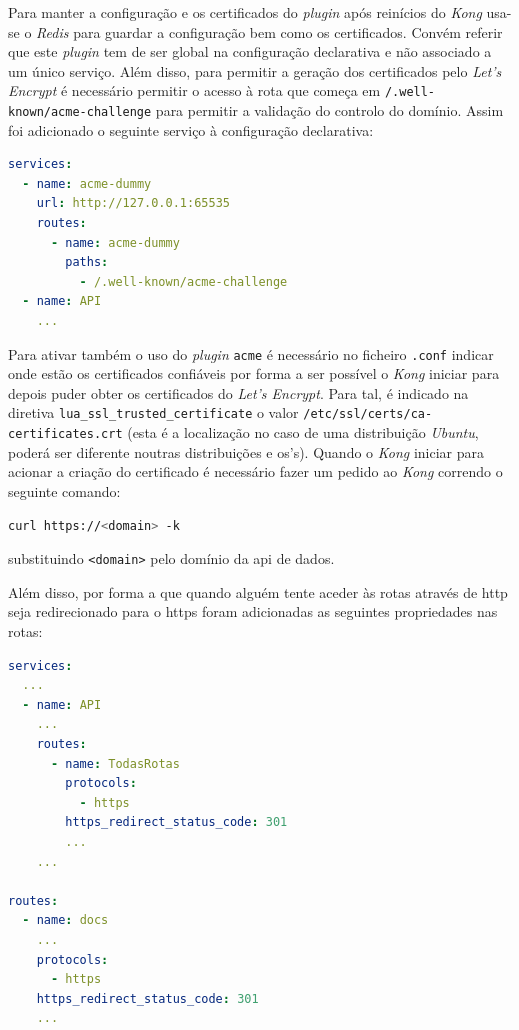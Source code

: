 Para manter a configuração e os certificados do \textit{plugin} após reinícios do \textit{Kong} usa-se o \textit{Redis} para guardar a configuração bem como os certificados. Convém referir que este \textit{plugin} tem de ser global na configuração declarativa e não associado a um único serviço. Além disso, para permitir a geração dos certificados pelo \textit{Let's Encrypt} é necessário permitir o acesso à rota que começa em \texttt{/.well-known/acme-challenge} para permitir a validação do controlo do domínio. Assim foi adicionado o seguinte serviço à configuração declarativa:

\begin{lstlisting}[language=yaml, caption=Configuração declarativa do \textit{Kong}: Serviço para a geração de certificados \acrshort{tls}]
services:
  - name: acme-dummy
    url: http://127.0.0.1:65535
    routes:
      - name: acme-dummy
        paths:
          - /.well-known/acme-challenge
  - name: API
    ...
\end{lstlisting}

Para ativar também o uso do \textit{plugin} \texttt{acme} é necessário no ficheiro \texttt{.conf} indicar onde estão os certificados confiáveis por forma a ser possível o \textit{Kong} iniciar para depois puder obter os certificados do \textit{Let's Encrypt}. Para tal, é indicado na diretiva \texttt{lua\_ssl\_trusted\_certificate} o valor \texttt{/etc/ssl/certs/ca-certificates.crt} (esta é a localização no caso de uma distribuição \textit{Ubuntu}, poderá ser diferente noutras distribuições e \acrshort{os}'s). Quando o \textit{Kong} iniciar para acionar a criação do certificado é necessário fazer um pedido ao \textit{Kong} correndo o seguinte comando:

\begin{lstlisting}[language=bash]
curl https://<domain> -k
\end{lstlisting}

substituindo \verb|<domain>| pelo domínio da \acrshort{api} de dados.

Além disso, por forma a que quando alguém tente aceder às rotas através de \acrshort{http} seja redirecionado para o \acrshort{https} foram adicionadas as seguintes propriedades nas rotas:

\begin{lstlisting}[language=yaml, caption=Configuração declarativa do \textit{Kong}: Serviço para a geração de certificados \acrshort{tls}]
services:
  ...
  - name: API
    ...
    routes:
      - name: TodasRotas
        protocols:
          - https
        https_redirect_status_code: 301
        ...
    ...

routes:
  - name: docs
    ...
    protocols:
      - https
    https_redirect_status_code: 301
    ...
\end{lstlisting}

